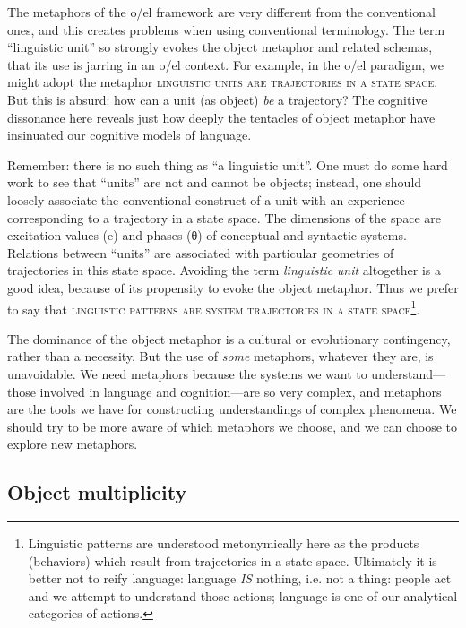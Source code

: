   The metaphors of the o/el framework are very different from the conventional ones, and this creates problems when using conventional terminology. The term “linguistic unit” so strongly evokes the object metaphor and related schemas, that its use is jarring in an o/el context. For example, in the o/el paradigm, we might adopt the metaphor \textsc{linguistic} \textsc{units} \textsc{are} \textsc{trajectories} \textsc{in} \textsc{a} \textsc{state} \textsc{space}. But this is absurd: how can a unit (as object) \textit{be} a trajectory? The cognitive dissonance here reveals just how deeply the tentacles of object metaphor have insinuated our cognitive models of language.

  Remember: there is no such thing as “a linguistic unit”. One must do some hard work to see that “units” are not and cannot be objects; instead, one should loosely associate the conventional construct of a unit with an experience corresponding to a trajectory in a state space. The dimensions of the space are excitation values (e) and phases (θ) of conceptual and syntactic systems. Relations between “units” are associated with particular geometries of trajectories in this state space. Avoiding the term \textit{linguistic} \textit{unit} altogether is a good idea, because of its propensity to evoke the object metaphor. Thus we prefer to say that \textsc{linguistic} \textsc{patterns} \textsc{are} \textsc{system} \textsc{trajectories} \textsc{in} \textsc{a} \textsc{state} \textsc{space}\footnote{Linguistic patterns are understood metonymically here as the products (behaviors) which result from trajectories in a state space. Ultimately it is better not to reify language: language \textit{IS} nothing, i.e. not a thing: people act and we attempt to understand those actions; language is one of our analytical categories of actions.}.

  The dominance of the object metaphor is a cultural or evolutionary contingency, rather than a necessity. But the use of \textit{some} metaphors, whatever they are, is unavoidable. We need metaphors because the systems we want to understand—those involved in language and cognition—are so very complex, and metaphors are the tools we have for constructing understandings of complex phenomena. We should try to be more aware of which metaphors we choose, and we can choose to explore new metaphors.

\subsection{Object multiplicity}

